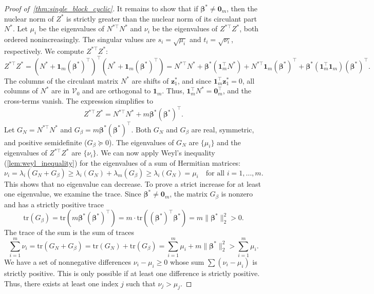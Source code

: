 \documentclass[11pt]{article}
\begin{document}
\begin{proof}[Proof of~\cref{thm:single_block_cyclic}]
It remains to show that if \(\boldsymbol{\beta}^* \neq \boldsymbol{0}_m\), then the nuclear norm of \(Z^*\) is strictly greater than the nuclear norm of its circulant part \(N^*\). Let \(\mu_i\) be the eigenvalues of \(N^{*\top}N^*\) and \(\nu_i\) be the eigenvalues of \(Z^{*\top}Z^*\), both ordered nonincreasingly. The singular values are \(s_i = \sqrt{\mu_i}\) and \(t_i = \sqrt{\nu_i}\), respectively.
We compute \(Z^{*\top}Z^*\):
\[ Z^{*\top}Z^* = (N^* + \boldsymbol{1}_m (\boldsymbol{\beta}^*)^\top)^\top (N^* + \boldsymbol{1}_m (\boldsymbol{\beta}^*)^\top) = N^{*\top}N^* + \boldsymbol{\beta}^*(\boldsymbol{1}_m^\top N^*) + N^{*\top}\boldsymbol{1}_m(\boldsymbol{\beta}^*)^\top + \boldsymbol{\beta}^*(\boldsymbol{1}_m^\top \boldsymbol{1}_m)(\boldsymbol{\beta}^*)^\top. \]
The columns of the circulant matrix \(N^*\) are shifts of \(\boldsymbol{z}_1^*\), and since \(\boldsymbol{1}_m^\top\boldsymbol{z}_1^*=0\), all columns of \(N^*\) are in \(\mathcal V_0\) and are orthogonal to \(\boldsymbol{1}_m\). Thus, \(\boldsymbol{1}_m^\top N^* = \boldsymbol{0}_m^\top\), and the cross-terms vanish. The expression simplifies to
\[ Z^{*\top}Z^* = N^{*\top}N^* + m \boldsymbol{\beta}^*(\boldsymbol{\beta}^*)^\top. \]
Let \(G_N = N^{*\top}N^*\) and \(G_\beta = m \boldsymbol{\beta}^*(\boldsymbol{\beta}^*)^\top\). Both \(G_N\) and \(G_\beta\) are real, symmetric, and positive semidefinite (\(G_\beta \succeq 0\)). The eigenvalues of \(G_N\) are \(\{\mu_i\}\) and the eigenvalues of \(Z^{*\top}Z^*\) are \(\{\nu_i\}\). We can now apply Weyl's inequality (\cref{lem:weyl_inequality}) for the eigenvalues of a sum of Hermitian matrices:
\[ \nu_i = \lambda_i(G_N+G_\beta) \ge \lambda_i(G_N) + \lambda_m(G_\beta) \ge \lambda_i(G_N) = \mu_i \quad \text{for all } i=1, \dots, m. \]
This shows that no eigenvalue can decrease. To prove a strict increase for at least one eigenvalue, we examine the trace. Since \(\boldsymbol{\beta}^* \neq \boldsymbol{0}_m\), the matrix \(G_\beta\) is nonzero and has a strictly positive trace
\[ \mathrm{tr}(G_\beta) = \mathrm{tr}(m \boldsymbol{\beta}^*(\boldsymbol{\beta}^*)^\top) = m \cdot \mathrm{tr}((\boldsymbol{\beta}^*)^\top\boldsymbol{\beta}^*) = m\|\boldsymbol{\beta}^*\|_2^2 > 0. \]
The trace of the sum is the sum of traces
\[ \sum_{i=1}^m \nu_i = \mathrm{tr}(G_N+G_\beta) = \mathrm{tr}(G_N) + \mathrm{tr}(G_\beta) = \sum_{i=1}^m \mu_i + m\|\boldsymbol{\beta}^*\|_2^2 > \sum_{i=1}^m \mu_i. \]
We have a set of nonnegative differences \(\nu_i - \mu_i \ge 0\) whose sum \(\sum(\nu_i-\mu_i)\) is strictly positive. This is only possible if at least one difference is strictly positive. Thus, there exists at least one index \(j\) such that \(\nu_j > \mu_j\).

\end{proof}
\end{document}
